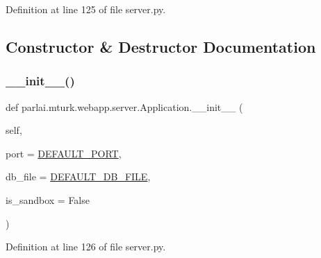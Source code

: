 Definition at line 125 of file server.\+py.



\subsection{Constructor \& Destructor Documentation}
\mbox{\label{classparlai_1_1mturk_1_1webapp_1_1server_1_1Application_a0c8d2d2d9418e9654a734ccef5a09942}} 
\subsubsection{\texorpdfstring{\+\_\+\+\_\+init\+\_\+\+\_\+()}{\_\_init\_\_()}}
{\footnotesize\ttfamily def parlai.\+mturk.\+webapp.\+server.\+Application.\+\_\+\+\_\+init\+\_\+\+\_\+ (\begin{DoxyParamCaption}\item[{}]{self,  }\item[{}]{port = {\ttfamily \hyperlink{namespaceparlai_1_1mturk_1_1webapp_1_1server_ab2dbe49416f69522010b6c9a211af0e3}{D\+E\+F\+A\+U\+L\+T\+\_\+\+P\+O\+RT}},  }\item[{}]{db\+\_\+file = {\ttfamily \hyperlink{namespaceparlai_1_1mturk_1_1webapp_1_1server_a7d1b65251987c39df64aeb32f36f6a9f}{D\+E\+F\+A\+U\+L\+T\+\_\+\+D\+B\+\_\+\+F\+I\+LE}},  }\item[{}]{is\+\_\+sandbox = {\ttfamily False} }\end{DoxyParamCaption})}



Definition at line 126 of file server.\+py.



